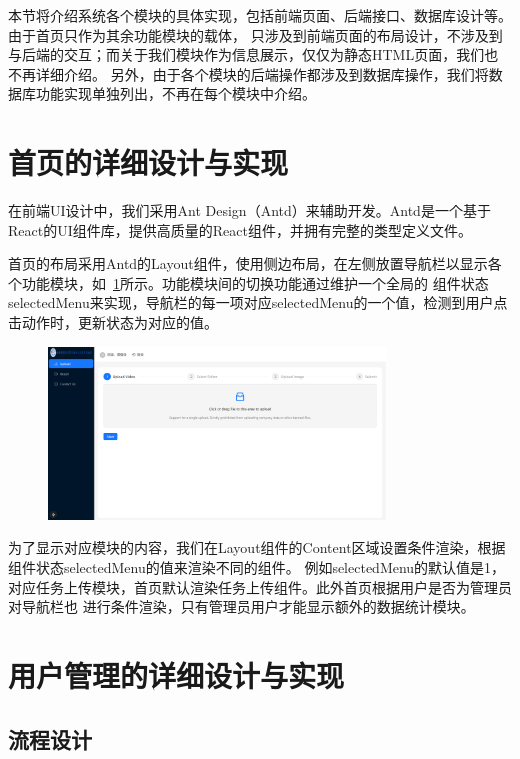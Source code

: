 本节将介绍系统各个模块的具体实现，包括前端页面、后端接口、数据库设计等。由于首页只作为其余功能模块的载体，
只涉及到前端页面的布局设计，不涉及到与后端的交互；而关于我们模块作为信息展示，仅仅为静态HTML页面，我们也不再详细介绍。
另外，由于各个模块的后端操作都涉及到数据库操作，我们将数据库功能实现单独列出，不再在每个模块中介绍。

\section{首页的详细设计与实现}

在前端UI设计中，我们采用Ant Design（Antd）来辅助开发。Antd是一个基于React的UI组件库，提供高质量的React组件，并拥有完整的类型定义文件。

首页的布局采用Antd的Layout组件，使用侧边布局，在左侧放置导航栏以显示各个功能模块，如~\ref{fig:app-dashboard}所示。功能模块间的切换功能通过维护一个全局的
组件状态selectedMenu来实现，导航栏的每一项对应selectedMenu的一个值，检测到用户点击动作时，更新状态为对应的值。

\begin{figure}[ht]
    \centering
    \includegraphics[width=0.8\textwidth]{source/img/app_dashboard.png}
    \label{fig:app-dashboard}
\end{figure}

为了显示对应模块的内容，我们在Layout组件的Content区域设置条件渲染，根据组件状态selectedMenu的值来渲染不同的组件。
例如selectedMenu的默认值是1，对应任务上传模块，首页默认渲染任务上传组件。此外首页根据用户是否为管理员对导航栏也
进行条件渲染，只有管理员用户才能显示额外的数据统计模块。

\section{用户管理的详细设计与实现}

\subsection{流程设计}


